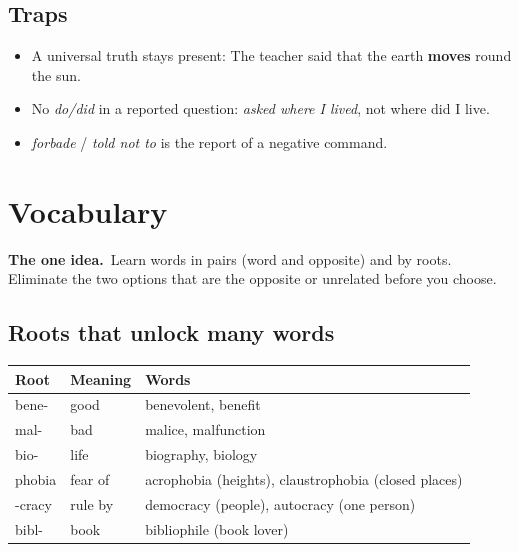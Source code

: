 \documentclass[11pt,a4paper]{article}
\let\oldsection\section
\renewcommand{\section}{\clearpage\oldsection}
\newcommand{\oneidea}[1]{\par\medskip\noindent\begingroup\setlength{\fboxsep}{7pt}%
  \colorbox{codebg}{\parbox{\dimexpr\linewidth-14pt\relax}{\textbf{\color{ember}The one idea.}\ #1}}\endgroup\par\medskip}
\newcommand{\bad}[1]{\textcolor{ember}{#1}}
\newcommand{\good}[1]{\textbf{#1}}
\begin{document}
\subsection*{Traps}
\begin{itemize}
\item A universal truth stays present: The teacher said that the earth \good{moves} round the sun.
\item No \emph{do/did} in a reported question: \emph{asked where I lived}, not \bad{where did I live}.
\item \emph{forbade} / \emph{told not to} is the report of a negative command.
\end{itemize}

\section{Vocabulary}
\oneidea{Learn words in pairs (word and opposite) and by roots. Eliminate the two options that are the opposite or unrelated before you choose.}
\subsection*{Roots that unlock many words}
\begin{center}\small\renewcommand{\arraystretch}{1.2}
\begin{tabularx}{\linewidth}{@{}>{\raggedright\arraybackslash}p{3cm} >{\raggedright\arraybackslash}p{3.3cm} >{\raggedright\arraybackslash}X@{}}
\toprule
\textbf{Root} & \textbf{Meaning} & \textbf{Words}\\
\midrule
bene- & good & benevolent, benefit\\
mal- & bad & malice, malfunction\\
bio- & life & biography, biology\\
phobia & fear of & acrophobia (heights), claustrophobia (closed places)\\
-cracy & rule by & democracy (people), autocracy (one person)\\
bibl- & book & bibliophile (book lover)\\
\bottomrule
\end{tabularx}
\end{center}
\end{document}
